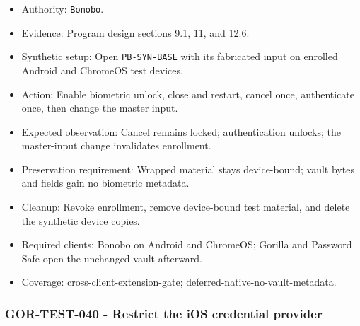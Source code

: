 \documentclass[
  letterpaper,
]{article}
\newcommand{\passthrough}[1]{#1}
\providecommand{\tightlist}{%
  \setlength{\itemsep}{0pt}\setlength{\parskip}{0pt}}
\begin{document}
\begin{itemize}
\tightlist
\item
  Authority: \passthrough{\lstinline!Bonobo!}.
\item
  Evidence: Program design sections 9.1, 11, and 12.6.
\item
  Synthetic setup: Open \nolinkurl{PB-SYN-BASE} with its fabricated input on enrolled Android and ChromeOS test devices.
\item
  Action: Enable biometric unlock, close and restart, cancel once, authenticate once, then change the master input.
\item
  Expected observation: Cancel remains locked; authentication unlocks; the master-input change invalidates enrollment.
\item
  Preservation requirement: Wrapped material stays device-bound; vault bytes and fields gain no biometric metadata.
\item
  Cleanup: Revoke enrollment, remove device-bound test material, and delete the synthetic device copies.
\item
  Required clients: Bonobo on Android and ChromeOS; Gorilla and Password Safe open the unchanged vault afterward.
\item
  Coverage: cross-client-extension-gate; deferred-native-no-vault-metadata.
\end{itemize}

\subsubsection{GOR-TEST-040 - Restrict the iOS credential
provider}\label{gor-test-040---restrict-the-ios-credential-provider}
\end{document}
